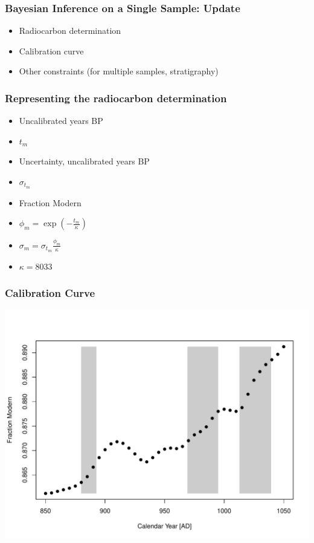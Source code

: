 \documentclass{beamer}
\begin{document}
\begin{frame}[t]
  \frametitle{Bayesian Inference on a Single Sample: Update}
    \begin{itemize}
    \item Radiocarbon determination
    \pause
    \item Calibration curve
    \pause
    \item Other constraints (for multiple samples, stratigraphy)
    \end{itemize}
\end{frame}

\begin{frame}[t]
  \frametitle{Representing the radiocarbon determination}
    \begin{itemize}
    \item Uncalibrated years BP
    \item $t_{m}$
    \pause
    \item Uncertainty, uncalibrated years BP
    \item $\sigma_{t_m}$
    \pause
    \item Fraction Modern
    \item $\phi_m = \exp(-\frac{t_m}{\kappa})$
    \item $\sigma_m = \sigma_{t_m} \frac{\phi_m}{\kappa}$
    \item $\kappa=8033$
    \end{itemize}
 
\end{frame}

\begin{frame}[t]
  \frametitle{Calibration Curve}
    \includegraphics[height=.85\textheight]{single_obs_inf_plot2.pdf}
\end{frame}
\end{document}
